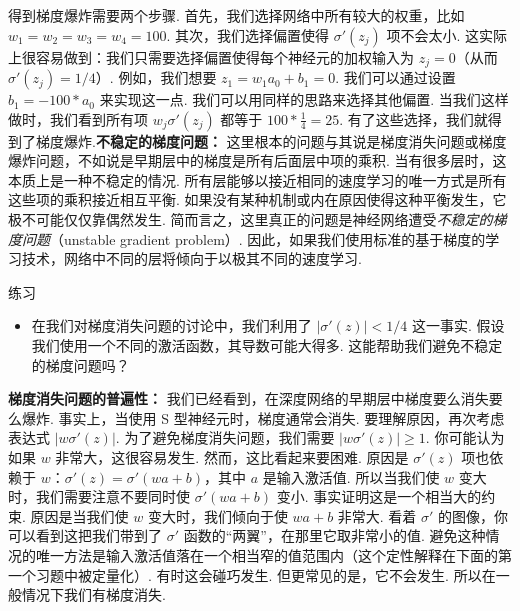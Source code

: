 得到梯度爆炸需要两个步骤. 首先，我们选择网络中所有较大的权重，比如 $w_1 = w_2 = w_3 = w_4 = 100$. 其次，我们选择偏置使得 $\sigma'(z_j)$ 项不会太小. 这实际上很容易做到：我们只需要选择偏置使得每个神经元的加权输入为 $z_j = 0$（从而 $\sigma'(z_j) = 1/4$）. 例如，我们想要 $z_1 = w_1 a_0 + b_1 = 0$. 我们可以通过设置 $b_1 = -100 * a_0$ 来实现这一点. 我们可以用同样的思路来选择其他偏置. 当我们这样做时，我们看到所有项 $w_j \sigma'(z_j)$ 都等于 $100 * \frac{1}{4} = 25$. 有了这些选择，我们就得到了梯度爆炸.\textbf{不稳定的梯度问题：} 这里根本的问题与其说是梯度消失问题或梯度爆炸问题，不如说是早期层中的梯度是所有后面层中项的乘积. 当有很多层时，这本质上是一种不稳定的情况. 所有层能够以接近相同的速度学习的唯一方式是所有这些项的乘积接近相互平衡. 如果没有某种机制或内在原因使得这种平衡发生，它极不可能仅仅靠偶然发生. 简而言之，这里真正的问题是神经网络遭受\emph{不稳定的梯度问题}（unstable gradient problem）\label{term:65}. 因此，如果我们使用标准的基于梯度的学习技术，网络中不同的层将倾向于以极其不同的速度学习.

\begin{exerciseBox}{练习}

\begin{itemize}

\item 在我们对梯度消失问题的讨论中，我们利用了 $|\sigma'(z)| < 1/4$ 这一事实. 假设我们使用一个不同的激活函数，其导数可能大得多. 这能帮助我们避免不稳定的梯度\label{term:67}问题吗？

\end{itemize}

\textbf{梯度消失问题的普遍性：} 我们已经看到，在深度网络的早期层中梯度要么消失要么爆炸. 事实上，当使用 S 型神经元时，梯度通常会消失. 要理解原因，再次考虑表达式 $|w \sigma'(z)|$. 为了避免梯度消失问题，我们需要 $|w \sigma'(z)| \geq 1$. 你可能认为如果 $w$ 非常大，这很容易发生. 然而，这比看起来要困难. 原因是 $\sigma'(z)$ 项也依赖于 $w$：$\sigma'(z) = \sigma'(wa +b)$，其中 $a$ 是输入激活值. 所以当我们使 $w$ 变大时，我们需要注意不要同时使 $\sigma'(wa+b)$ 变小. 事实证明这是一个相当大的约束. 原因是当我们使 $w$ 变大时，我们倾向于使 $wa+b$ 非常大. 看着 $\sigma'$ 的图像，你可以看到这把我们带到了 $\sigma'$ 函数的``两翼''，在那里它取非常小的值. 避免这种情况的唯一方法是输入激活值落在一个相当窄的值范围内（这个定性解释在下面的第一个习题中被定量化）. 有时这会碰巧发生. 但更常见的是，它不会发生. 所以在一般情况下我们有梯度消失.

\end{exerciseBox}

